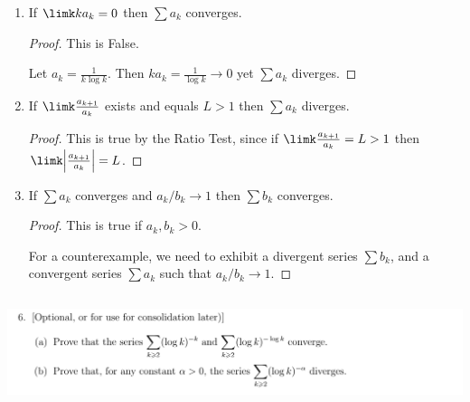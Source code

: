 \documentclass[12pt]{article}
\begin{document}
\begin{enumerate}[label=(\alph*)]

\item
  \begin{claim*}
    If $\limk ka_k = 0$ then $\sum a_k$ converges.
  \end{claim*}
  \begin{proof}
    This is False.

    Let $a_k = \frac{1}{k\log k}$. Then $ka_k = \frac{1}{\log k} \to 0$ yet $\sum a_k$ diverges.
  \end{proof}

\item
  \begin{claim*}
    If $\limk \frac{a_{k+1}}{a_k}$ exists and equals $L > 1$ then $\sum a_k$ diverges.
  \end{claim*}
  \begin{proof}
    This is true by the Ratio Test, since if $\limk \frac{a_{k+1}}{a_k} = L > 1$ then\\
    $\limk \Big|\frac{a_{k+1}}{a_k}\Big| = L$.
  \end{proof}

\item
  \begin{claim*}
    If $\sum a_k$ converges and $a_k/b_k \to 1$ then $\sum b_k$ converges.
  \end{claim*}
  \begin{proof}
    This is true if $a_k, b_k > 0$.

    For a counterexample, we need to exhibit a divergent series $\sum b_k$, and a convergent series
    $\sum a_k$ such that $a_k/b_k \to 1$.

  \end{proof}
\end{enumerate}

\newpage
\subsection{}
\begin{mdframed}
\includegraphics[width=400pt]{img/analysis--oxford-M2-I-6-6.png}
\end{mdframed}
\end{document}

